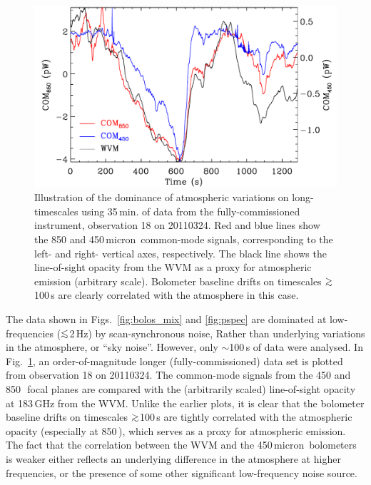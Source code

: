 \documentclass[useAMS,usenatbib,nofootinbib]{mn2e}
\def\lsim{\mathrel{\lower2.5pt\vbox{\lineskip=0pt\baselineskip=0pt
          \hbox{$<$}\hbox{$\sim$}}}}
\def\gsim{\mathrel{\lower2.5pt\vbox{\lineskip=0pt\baselineskip=0pt
          \hbox{$>$}\hbox{$\sim$}}}}
\begin{document}
\begin{figure}
\centering
\includegraphics[width=\linewidth]{skynoise}
\caption{Illustration of the dominance of atmospheric variations on
  long-timescales using 35\,min. of data from the fully-commissioned
  instrument, observation 18 on 20110324. Red and blue lines show the
  850 and 450\,micron\ common-mode signals, corresponding to the left-
  and right- vertical axes, respectively. The black line shows the
  line-of-sight opacity from the WVM as a proxy for atmospheric
  emission (arbitrary scale). Bolometer baseline drifts on timescales
  $\gsim$100\,s are clearly correlated with the atmosphere in this
  case.}
\label{fig:skynoise}
\end{figure}

The data shown in Figs.~\ref{fig:bolos_mix} and \ref{fig:pspec} are
dominated at low-frequencies ($\lsim$2\,Hz) by scan-synchronous noise,
Rather than underlying variations in the atmosphere, or ``sky
noise''. However, only $\sim$100\,s of data were analysed. In
Fig.~\ref{fig:skynoise}, an order-of-magnitude longer
(fully-commissioned) data set is plotted from observation 18 on
20110324. The common-mode signals from the 450 and 850\,\micron\ focal
planes are compared with the (arbitrarily scaled) line-of-sight
opacity at 183\,GHz from the WVM. Unlike the earlier plots, it is
clear that the bolometer baseline drifts on timescales $\gsim$100\,s
are tightly correlated with the atmospheric opacity (especially at
850\,\micron), which serves as a proxy for atmospheric emission. The
fact that the correlation between the WVM and the 450\,micron\
bolometers is weaker either reflects an underlying difference in the
atmosphere at higher frequencies, or the presence of some other
significant low-frequency noise source.
\end{document}
